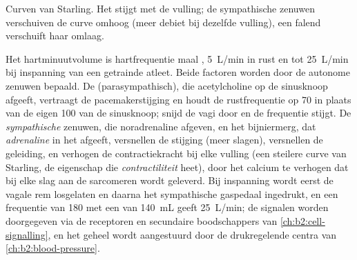 \begin{omfigure}

{\small Curven van Starling. Het  stijgt met de vulling; de
sympathische zenuwen verschuiven de curve omhoog (meer debiet bij dezelfde
vulling), een falend  verschuift haar omlaag.}
\end{omfigure}

\begin{proposition}\label{prop:b2:heart:control}
Het hartminuutvolume is hartfrequentie maal , \qty{5}{L/min}
in rust en tot \qty{25}{L/min} bij inspanning van een getrainde atleet.
Beide factoren worden door de autonome zenuwen bepaald. De \emph{} (parasympathisch), die acetylcholine op de sinusknoop afgeeft,
vertraagt de pacemakerstijging en houdt de rustfrequentie op 70 in plaats
van de eigen 100 van de sinusknoop; snijd de vagi door en de frequentie
stijgt. De \emph{sympathische} zenuwen, die noradrenaline afgeven, en het
bijniermerg, dat \emph{adrenaline} in het  afgeeft, versnellen de
stijging (meer slagen), versnellen de geleiding, en verhogen de
contractiekracht bij elke vulling (een steilere curve van Starling, de
eigenschap die \emph{contractiliteit} heet), door het calcium te verhogen
dat bij elke slag aan de sarcomeren wordt geleverd. Bij inspanning wordt
eerst de vagale rem losgelaten en daarna het sympathische gaspedaal
ingedrukt, en een frequentie van 180 met een  van \qty{140}{mL}
geeft \qty{25}{L/min}; de signalen worden doorgegeven via de receptoren en
secundaire boodschappers van \cref{ch:b2:cell-signalling}, en het geheel
wordt aangestuurd door de drukregelende centra van
\cref{ch:b2:blood-pressure}.
\end{proposition}

